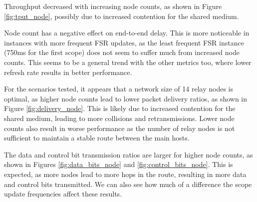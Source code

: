 \documentclass{winslabreport}
\begin{document}
Throughput decreased with increasing node counts, as shown in Figure \ref{fig:tput_node}, possibly due to increased contention for the shared medium.

Node count has a negative effect on end-to-end delay. This is more noticeable in instances with more frequent FSR updates, as the least frequent FSR instance (750ms for the first scope) does not seem to suffer much from increased node counts. This seems to be a general trend with the other metrics too, where lower refresh rate results in better performance.

For the scenarios tested, it appears that a network size of 14 relay nodes is optimal, as higher node counts lead to lower packet delivery ratios, as shown in Figure \ref{fig:delivery_node}. This is likely due to increased contention for the shared medium, leading to more collisions and retransmissions. Lower node counts also result in worse performance as the number of relay nodes is not sufficient to maintain a stable route between the main hosts.

The data and control bit transmission ratios are larger for higher node counts, as shown in Figures \ref{fig:data_bits_node} and \ref{fig:control_bits_node}. This is expected, as more nodes lead to more hops in the route, resulting in more data and control bits transmitted. We can also see how much of a difference the scope update frequencies affect these results.
\end{document}
